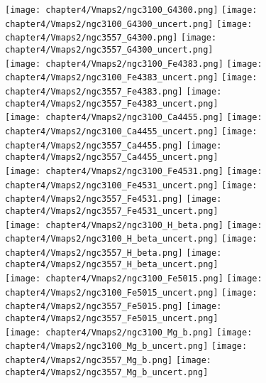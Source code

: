 \begin{figure*}
	\centering
	\texttt{[image: chapter4/Vmaps2/ngc3100\_G4300.png]}
	\texttt{[image: chapter4/Vmaps2/ngc3100\_G4300\_uncert.png]}
	\texttt{[image: chapter4/Vmaps2/ngc3557\_G4300.png]}
	\texttt{[image: chapter4/Vmaps2/ngc3557\_G4300\_uncert.png]}
	\\
	\texttt{[image: chapter4/Vmaps2/ngc3100\_Fe4383.png]}
	\texttt{[image: chapter4/Vmaps2/ngc3100\_Fe4383\_uncert.png]}
	\texttt{[image: chapter4/Vmaps2/ngc3557\_Fe4383.png]}
	\texttt{[image: chapter4/Vmaps2/ngc3557\_Fe4383\_uncert.png]}
	\\
	\texttt{[image: chapter4/Vmaps2/ngc3100\_Ca4455.png]}
	\texttt{[image: chapter4/Vmaps2/ngc3100\_Ca4455\_uncert.png]}
	\texttt{[image: chapter4/Vmaps2/ngc3557\_Ca4455.png]}
	\texttt{[image: chapter4/Vmaps2/ngc3557\_Ca4455\_uncert.png]}
	\\
	\texttt{[image: chapter4/Vmaps2/ngc3100\_Fe4531.png]}
	\texttt{[image: chapter4/Vmaps2/ngc3100\_Fe4531\_uncert.png]}
	\texttt{[image: chapter4/Vmaps2/ngc3557\_Fe4531.png]}
	\texttt{[image: chapter4/Vmaps2/ngc3557\_Fe4531\_uncert.png]}
	\\
	\texttt{[image: chapter4/Vmaps2/ngc3100\_H\_beta.png]}
	\texttt{[image: chapter4/Vmaps2/ngc3100\_H\_beta\_uncert.png]}
	\texttt{[image: chapter4/Vmaps2/ngc3557\_H\_beta.png]}
	\texttt{[image: chapter4/Vmaps2/ngc3557\_H\_beta\_uncert.png]}
	\\
	\texttt{[image: chapter4/Vmaps2/ngc3100\_Fe5015.png]}
	\texttt{[image: chapter4/Vmaps2/ngc3100\_Fe5015\_uncert.png]}
	\texttt{[image: chapter4/Vmaps2/ngc3557\_Fe5015.png]}
	\texttt{[image: chapter4/Vmaps2/ngc3557\_Fe5015\_uncert.png]}
	\\
	\texttt{[image: chapter4/Vmaps2/ngc3100\_Mg\_b.png]}
	\texttt{[image: chapter4/Vmaps2/ngc3100\_Mg\_b\_uncert.png]}
	\texttt{[image: chapter4/Vmaps2/ngc3557\_Mg\_b.png]}
	\texttt{[image: chapter4/Vmaps2/ngc3557\_Mg\_b\_uncert.png]}
	\\
\end{figure*}

